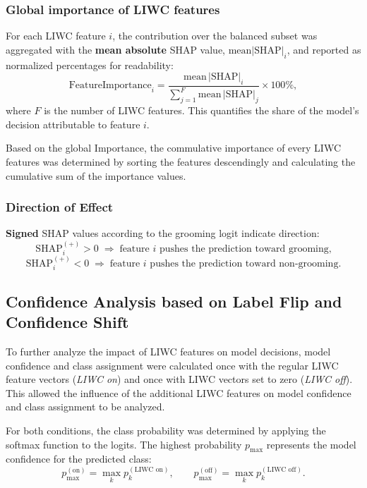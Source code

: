 
\subsubsection{Global importance of LIWC features}

For each LIWC feature $i$, the contribution over the balanced subset was aggregated with the \textbf{mean absolute} SHAP value, $\mathrm{mean}|\mathrm{SHAP}|_i$, and reported as normalized percentages for readability:
\[
\text{FeatureImportance}_{i}
= \frac{\mathrm{mean}\,|\mathrm{SHAP}|_{i}}{\sum_{j=1}^{F} \mathrm{mean}\,|\mathrm{SHAP}|_{j}} \times 100\% ,
\]
where $F$ is the number of LIWC features. This quantifies the share of the model’s decision attributable to feature $i$.

Based on the global Importance, the commulative importance of every LIWC features was determined by sorting the features descendingly and calculating the cumulative sum of the importance values. 

\subsubsection{Direction of Effect}

\textbf{Signed} SHAP values according to the grooming logit indicate direction:
\[
\mathrm{SHAP}^{(+)}_{i} > 0 \;\Rightarrow\; \text{feature } i \text{ pushes the prediction toward grooming,}
\]
\[
\mathrm{SHAP}^{(+)}_{i} < 0 \;\Rightarrow\; \text{feature } i \text{ pushes the prediction toward non-grooming.}
\]

\subsection{Confidence Analysis based on Label Flip and Confidence Shift}

To further analyze the impact of LIWC features on model decisions, model confidence and class assignment were calculated once with the regular LIWC feature vectors (\emph{LIWC on}) and once with LIWC vectors set to zero (\emph{LIWC off}). This allowed the influence of the additional LIWC features on model confidence and class assignment to be analyzed.

For both conditions, the class probability was determined by applying the softmax function to the logits. The highest probability \(p_{\max}\) represents the model confidence for the predicted class:
\[
p_{\max}^{(\text{on})} = \max_k p_k^{(\text{LIWC on})}, \qquad
p_{\max}^{(\text{off})} = \max_k p_k^{(\text{LIWC off})}.
\]

